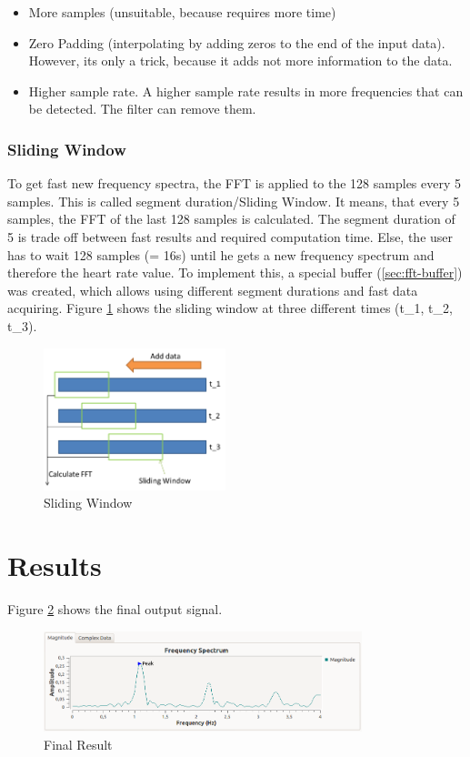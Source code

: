 \documentclass[notitlepage]{scrreprt}
\begin{document}
\begin{itemize}
	\item{More samples (unsuitable, because requires more time)}
	\item{Zero Padding (interpolating by adding zeros to the end of the input data). However, its only a trick, because it adds not more information to the data.}
	\item{Higher sample rate. A higher sample rate results in more frequencies that can be detected. The filter can remove them.}
\end{itemize}

\subsubsection{Sliding Window}
\label{subsubsec:sliding-window}
To get fast new frequency spectra, the FFT is applied to the 128 samples every 5 samples. This is called segment duration/Sliding Window. It means, that every 5 samples, the FFT of the last 128 samples is calculated. The segment duration of 5 is trade off between fast results and required computation time. Else, the user has to wait 128 samples (= 16s) until he gets a new frequency spectrum and therefore the heart rate value. To implement this, a special buffer (\ref{sec:fft-buffer}) was created, which allows using different segment durations and fast data acquiring. Figure \ref{fig:sliding-window} shows the sliding window at three different times (t\_1, t\_2, t\_3).

\begin{figure}[H]
	\centering
	\includegraphics[width=200px]{images/slidingWindow.png}
	\caption{Sliding Window}
	\label{fig:sliding-window}
\end{figure}

\section{Results}
Figure \ref{fig:result} shows the final output signal.

\begin{figure}[H]
	\centering
	\includegraphics[width=350px]{images/withEverything.png}
	\caption{Final Result}
	\label{fig:result}
\end{figure}
\end{document}
